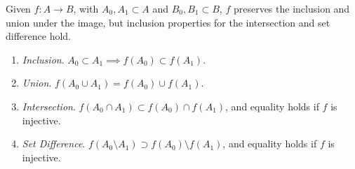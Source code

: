   \begin{theorem}
    Given $f: A \rightarrow B$, with $A_0, A_1 \subset A$ and $B_0, B_1 \subset B$, $f$ preserves the inclusion and union under the image, but inclusion properties for the intersection and set difference hold. 
    \begin{enumerate}
      \item \textit{Inclusion}. $A_0 \subset A_1 \implies f(A_0) \subset f(A_1)$. 
      \item \textit{Union}. $f(A_0 \cup A_1) = f(A_0) \cup f(A_1)$. 
      \item \textit{Intersection}. $f(A_0 \cap A_1) \subset f(A_0) \cap f (A_1)$, and equality holds if $f$ is injective. 
      \item \textit{Set Difference}. $f(A_0 \setminus A_1) \supset f(A_0) \setminus f(A_1)$, and equality holds if $f$ is injective. 
    \end{enumerate}
  \end{theorem} 
